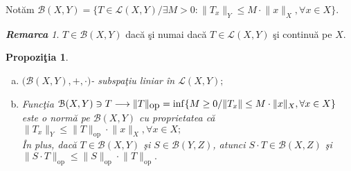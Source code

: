 \documentclass[ a4paper, 12pt]{report}
\newtheorem{prop}[theorem]{\bf Propozi\c tia }
\theoremstyle{definition}
\theoremstyle{remark}
\newtheorem{remarc}{\bf Remarca}[section]
\numberwithin{equation}{section}
\begin{document}
Not\u am $\mathcal{B}(X,Y) = \{ T \in \mathcal{L}(X,Y) / \exists M>0: \lVert T_x \rVert_{Y} \leq M \cdot \lVert x \rVert_{X}, \forall x \in X \}.$
\begin{remarc}
$T \in \mathcal{B}(X,Y) $ dac\u a \c si numai dac\u a $T \in \mathcal{L}(X,Y)$ \c si continu\u a pe $X$.
\end{remarc}
\begin{prop}
\begin{enumerate}[(a)]
\item $\Big(\mathcal{B}(X,Y), +, \cdot\Big)$- subspa\c tiu liniar \^in $\mathcal{L}(X,Y);$
\item Func\c tia $\mathcal{B}(X,Y) \ni T \longrightarrow \lVert T \rVert_{\mbox{op}} = \inf \{ M \geq 0 / \lVert T_x \rVert \leq M \cdot \lVert x \rVert_{X},\\ \forall x \in X\}$ este o norm\u a pe $\mathcal{B}(X,Y)$ cu proprietatea c\u a\\ $\lVert T_x \rVert_{Y} \leq \lVert T \rVert_{\mbox{op}} \cdot \lVert x \rVert_{X}, \forall x \in X;$\\
\^In plus, dac\u a $T \in \mathcal{B}(X,Y)$ \c si $S \in \mathcal{B}(Y,Z)$, atunci $S \cdot T \in \mathcal{B}(X,Z)$ \c si $\lVert S \cdot T \rVert_{\mbox{op}} \leq \lVert S \rVert_{\mbox{op}} \cdot \lVert T \rVert_{\mbox{op}}.$
\end{enumerate}







\end{prop}
\end{document}
